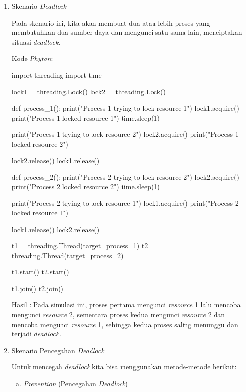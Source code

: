 \documentclass[12pt]{article}
\begin{document}
\begin{enumerate}
    \item Skenario \textit{Deadlock}

    Pada skenario ini, kita akan membuat dua atau lebih proses yang membutuhkan dua sumber daya dan mengunci satu sama lain, menciptakan situasi \textit{deadlock}.


    Kode \textit{Phyton}:

    \begin{python}
import threading
import time

lock1 = threading.Lock()
lock2 = threading.Lock()

def process_1():
    print("Process 1 trying to lock resource 1")
    lock1.acquire()
    print("Process 1 locked resource 1")
    time.sleep(1)
    
    print("Process 1 trying to lock resource 2")
    lock2.acquire()
    print("Process 1 locked resource 2")
    
    lock2.release()
    lock1.release()

def process_2():
    print("Process 2 trying to lock resource 2")
    lock2.acquire()
    print("Process 2 locked resource 2")
    time.sleep(1)
    
    print("Process 2 trying to lock resource 1")
    lock1.acquire()
    print("Process 2 locked resource 1")
    
    lock1.release()
    lock2.release()

t1 = threading.Thread(target=process_1)
t2 = threading.Thread(target=process_2)

t1.start()
t2.start()

t1.join()
t2.join()

    \end{python}

    Hasil : Pada simulasi ini, proses pertama mengunci \textit{resource} 1 lalu mencoba mengunci \textit{resource} 2, sementara proses kedua mengunci \textit{resource} 2 dan mencoba mengunci \textit{resource} 1, sehingga kedua proses saling menunggu dan terjadi \textit{deadlock.}

    \item Skenario Pencegahan \textit{Deadlock}

    Untuk mencegah \textit{deadlock} kita bisa menggunakan metode-metode berikut:

    \begin{enumerate}[a.]
        \item \textit{Prevention} (Pencegahan \textit{Deadlock})


\end{enumerate}
\end{enumerate}
\end{document}
